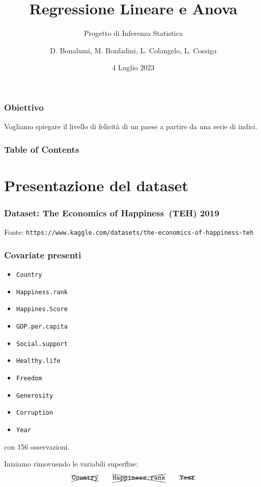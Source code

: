 \documentclass{beamer}
\title{Regressione Lineare e Anova}
\subtitle{Progetto di Inferenza Statistica}
\author{ D. Bonalumi, M. Bonfadini, L. Colangelo, L. Cossiga}
\institute{Politecnico di Milano}
\date{4 Luglio 2023}
\begin{document}
\frame{\titlepage}

\begin{frame}
    \frametitle{Obiettivo}
    Vogliamo spiegare il livello di felicità di un paese a partire da una serie di indici.
\end{frame}

\begin{frame}
    \frametitle{Table of Contents}
    \tableofcontents
\end{frame}

\section{Presentazione del dataset}

\begin{frame}
    \frametitle{Dataset: The Economics of Happiness (TEH) 2019}
    Fonte: 
    \smallskip
    \footnotesize{\texttt{https://www.kaggle.com/datasets/the-economics-of-happiness-teh}}
\end{frame}

\begin{frame}
    \frametitle{Covariate presenti}
	\begin{itemize}
	\item \texttt{Country}
	\item \texttt{Happiness.rank}
	\item \texttt{Happines.Score}
	\item \texttt{GDP.per.capita}
	\item \texttt{Social.support}
	\item \texttt{Healthy.life}
	\item \texttt{Freedom}
	\item \texttt{Generosity}
	\item \texttt{Corruption}
	\item \texttt{Year}
	\end{itemize}
	con 156 osservazioni.
\end{frame}

\begin{frame}
    Iniziamo rimovuendo le variabili superflue:
    \begin{equation*}
    \xcancel{\texttt{Country}} \qquad \xcancel{\texttt{Happiness.rank}}\qquad\xcancel{\texttt{Year}}
    \end{equation*}
\end{frame}
\end{document}

